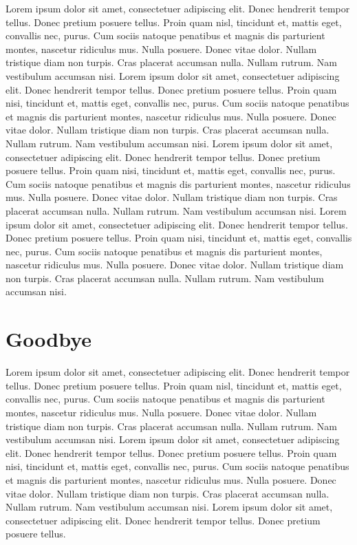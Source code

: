 \documentclass[12pt]{report}
\begin{document}
Lorem ipsum dolor sit amet, consectetuer adipiscing elit. Donec
hendrerit tempor tellus. Donec pretium posuere tellus. Proin quam
nisl, tincidunt et, mattis eget, convallis nec, purus. Cum sociis
natoque penatibus et magnis dis parturient montes, nascetur ridiculus
mus. Nulla posuere. Donec vitae dolor. Nullam tristique diam non
turpis. Cras placerat accumsan nulla. Nullam rutrum. Nam vestibulum
accumsan nisi.  Lorem ipsum dolor sit amet, consectetuer adipiscing
elit. Donec hendrerit tempor tellus. Donec pretium posuere
tellus. Proin quam nisi, tincidunt et, mattis eget, convallis nec,
purus. Cum sociis natoque penatibus et magnis dis parturient montes,
nascetur ridiculus mus. Nulla posuere. Donec vitae dolor. Nullam
tristique diam non turpis. Cras placerat accumsan nulla. Nullam
rutrum. Nam vestibulum accumsan nisi.  Lorem ipsum dolor sit amet,
consectetuer adipiscing elit. Donec hendrerit tempor tellus. Donec
pretium posuere tellus. Proin quam nisi, tincidunt et, mattis eget,
convallis nec, purus. Cum sociis natoque penatibus et magnis dis
parturient montes, nascetur ridiculus mus. Nulla posuere. Donec vitae
dolor. Nullam tristique diam non turpis. Cras placerat accumsan
nulla. Nullam rutrum. Nam vestibulum accumsan nisi.  Lorem ipsum dolor
sit amet, consectetuer adipiscing elit. Donec hendrerit tempor
tellus. Donec pretium posuere tellus. Proin quam nisi, tincidunt et,
mattis eget, convallis nec, purus. Cum sociis natoque penatibus et
magnis dis parturient montes, nascetur ridiculus mus. Nulla
posuere. Donec vitae dolor. Nullam tristique diam non turpis. Cras
placerat accumsan nulla. Nullam rutrum. Nam vestibulum accumsan nisi.

\chapter{Goodbye}

Lorem ipsum dolor sit amet, consectetuer adipiscing elit. Donec
hendrerit tempor tellus. Donec pretium posuere tellus. Proin quam
nisl, tincidunt et, mattis eget, convallis nec, purus. Cum sociis
natoque penatibus et magnis dis parturient montes, nascetur ridiculus
mus. Nulla posuere. Donec vitae dolor. Nullam tristique diam non
turpis. Cras placerat accumsan nulla. Nullam rutrum. Nam vestibulum
accumsan nisi.  Lorem ipsum dolor sit amet, consectetuer adipiscing
elit. Donec hendrerit tempor tellus. Donec pretium posuere
tellus. Proin quam nisi, tincidunt et, mattis eget, convallis nec,
purus. Cum sociis natoque penatibus et magnis dis parturient montes,
nascetur ridiculus mus. Nulla posuere. Donec vitae dolor. Nullam
tristique diam non turpis. Cras placerat accumsan nulla. Nullam
rutrum. Nam vestibulum accumsan nisi.  Lorem ipsum dolor sit amet,
consectetuer adipiscing elit. Donec hendrerit tempor tellus. Donec
pretium posuere tellus. 
\end{document}
